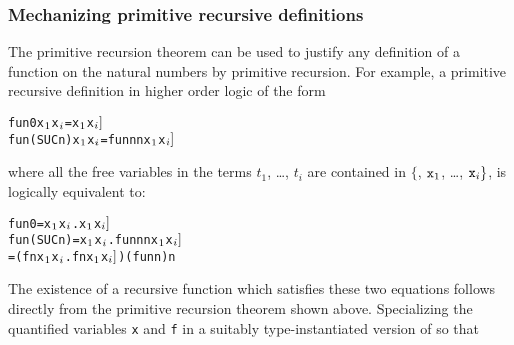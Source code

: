 \subsubsection{Mechanizing primitive recursive definitions}
\label{num-prim-rec}

The primitive
recursion theorem can be used to justify any definition of a function
on the natural numbers by primitive recursion.  For example, a
primitive recursive definition in higher order logic of the form

\begin{hol}
\begin{alltt}
   fun 0       x\(\sb{1}\) \m{\dots} x\(\sb{i}\) = \m{f\sb{1}[}x\(\sb{1}\)\m{,\ldots,\,} x\(\sb{i}]\)
   fun (SUC n) x\(\sb{1}\) \m{\dots} x\(\sb{i}\) = \m{f\sb{2}[}fun n  n\m{,} x\(\sb{1}\)\m{,\ldots,\,}x\(\sb{i}]\)
\end{alltt}
\end{hol}

\noindent where all the free variables in the  terms $t_1$,
\dots, $t_i$ are contained in $\{$, $\ml{x}_1$, \dots, $\ml{x}_i\}$,
is logically equivalent to:

\begin{hol}
\begin{alltt}
   fun 0       = \bs{}x\(\sb{1}\) \m{\dots} x\(\sb{i}\).\m{f\sb{1}[}x\(\sb{1}\)\m{,\ldots,\,}x\(\sb{i}]\)
   fun (SUC n) = \bs{}x\(\sb{1}\) \m{\dots} x\(\sb{i}\).\m{f\sb{2}[}fun n  n\m{,}x\(\sb{1}\)\m{,\ldots,\,}x\(\sb{i}]\)
               = (\bs{}f n x\(\sb{1}\) \m{\dots} x\(\sb{i}\).\m{f\sb{2}[}f  n\m{,} x\(\sb{1}\)\m{,\ldots,\,}x\(\sb{i}]\)) (fun n) n
\end{alltt}
\end{hol}

The existence  of  a  recursive  function   which  satisfies these two
equations follows directly from the primitive recursion theorem
 shown above.   Specializing the  quantified variables \verb!x!
and \verb!f!  in  a suitably  type-instantiated version  of  so
that

